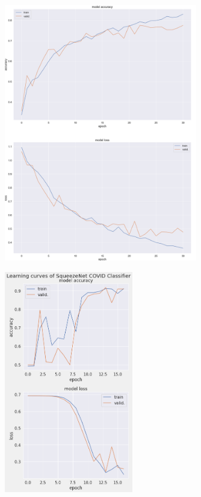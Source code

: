 \begin{figure}[H]
    \centering
    \includegraphics[width=0.75\textwidth]{../results/SqueezeNet_curves.png}
    \caption{}
\end{figure}

\begin{figure}[H]
    \centering
    \includegraphics[width=0.5\textwidth]{../results/Binary_SqueezeNet_curves.png}
    \caption{}
\end{figure}